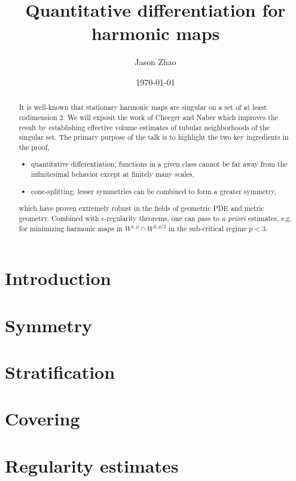 \documentclass[reqno]{amsart}
\title
{
	Quantitative differentiation for harmonic maps
}
\author{Jason Zhao}
\date{\today}
\begin{document}
\maketitle

\begin{abstract}
	It is well-known that stationary harmonic maps are singular on a set of at least codimension $2$. We will exposit the work of Cheeger and Naber \cite{CheegerNaber2013} which improves the result by establishing effective volume estimates of tubular neighborhoods of the singular set. The primary purpose of the talk is to highlight the two key ingredients in the proof, 
	\begin{itemize}
		\item quantitative differentiation; functions in a given class cannot be far away from the infinitesimal behavior except at finitely many scales,
		\item cone-splitting; lesser symmetries can be combined to form a greater symmetry,
	\end{itemize}
which have proven extremely robust in the fields of geometric PDE and metric geometry. Combined with $\epsilon$-regularity theorems, one can pass to \textit{a priori} estimates, e.g. for minimizing harmonic maps in $W^{1, p} \cap W^{2, p/2}$ in the sub-critical regime $p < 3$. 
\end{abstract}

\tableofcontents

\section{Introduction}


\section{Symmetry}


\section{Stratification}


\section{Covering}


\section{Regularity estimates}




\end{document}
